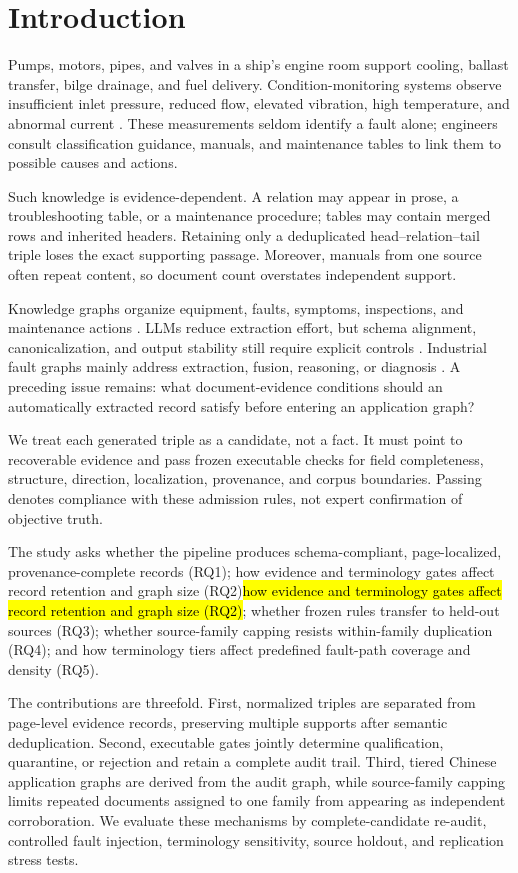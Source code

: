 \documentclass[conference,a4paper]{IEEEtran}
\DeclareRobustCommand{\rev}[1]{\ifdefined\CleanVersion#1\else\hl{#1}\fi}
\begin{document}
\section{Introduction}

Pumps, motors, pipes, and valves in a ship's engine room support cooling, ballast transfer, bilge drainage, and fuel delivery. Condition-monitoring systems observe insufficient inlet pressure, reduced flow, elevated vibration, high temperature, and abnormal current \cite{ABS2016,ABS2023}. These measurements seldom identify a fault alone; engineers consult classification guidance, manuals, and maintenance tables to link them to possible causes and actions.

Such knowledge is evidence-dependent. A relation may appear in prose, a troubleshooting table, or a maintenance procedure; tables may contain merged rows and inherited headers. Retaining only a deduplicated head--relation--tail triple loses the exact supporting passage. Moreover, manuals from one source often repeat content, so document count overstates independent support.

Knowledge graphs organize equipment, faults, symptoms, inspections, and maintenance actions \cite{Hogan2021,Ji2022}. LLMs reduce extraction effort, but schema alignment, canonicalization, and output stability still require explicit controls \cite{Zhang2024EDC}. Industrial fault graphs mainly address extraction, fusion, reasoning, or diagnosis \cite{Han2022,Cai2024,Wu2024}. A preceding issue remains: what document-evidence conditions should an automatically extracted record satisfy before entering an application graph?

We treat each generated triple as a candidate, not a fact. It must point to recoverable evidence and pass frozen executable checks for field completeness, structure, direction, localization, provenance, and corpus boundaries. Passing denotes compliance with these admission rules, not expert confirmation of objective truth.

The study asks whether the pipeline produces schema-compliant, page-localized, provenance-complete records (RQ1); \rev{how evidence and terminology gates affect record retention and graph size (RQ2)}; whether frozen rules transfer to held-out sources (RQ3); whether source-family capping resists within-family duplication (RQ4); and how terminology tiers affect predefined fault-path coverage and density (RQ5).

The contributions are threefold. First, normalized triples are separated from page-level evidence records, preserving multiple supports after semantic deduplication. Second, executable gates jointly determine qualification, quarantine, or rejection and retain a complete audit trail. Third, tiered Chinese application graphs are derived from the audit graph, while source-family capping limits repeated documents assigned to one family from appearing as independent corroboration. We evaluate these mechanisms by complete-candidate re-audit, controlled fault injection, terminology sensitivity, source holdout, and replication stress tests.
\end{document}
